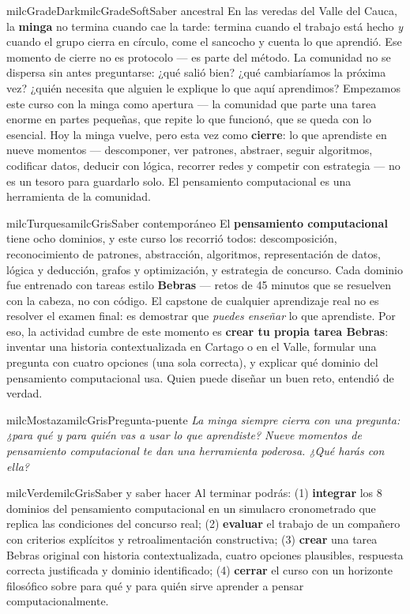 \documentclass[11pt,letterpaper]{article}
\begin{document}
\begin{softbox}{milcGradeDark}{milcGradeSoft}{Saber ancestral}
En las veredas del Valle del Cauca, la \textbf{minga} no termina cuando cae la tarde: termina cuando el trabajo está hecho \emph{y} cuando el grupo cierra en círculo, come el sancocho y cuenta lo que aprendió. Ese momento de cierre no es protocolo --- es parte del método. La comunidad no se dispersa sin antes preguntarse: ¿qué salió bien? ¿qué cambiaríamos la próxima vez? ¿quién necesita que alguien le explique lo que aquí aprendimos? Empezamos este curso con la minga como apertura --- la comunidad que parte una tarea enorme en partes pequeñas, que repite lo que funcionó, que se queda con lo esencial. Hoy la minga vuelve, pero esta vez como \textbf{cierre}: lo que aprendiste en nueve momentos --- descomponer, ver patrones, abstraer, seguir algoritmos, codificar datos, deducir con lógica, recorrer redes y competir con estrategia --- no es un tesoro para guardarlo solo. El pensamiento computacional es una herramienta de la comunidad.
\end{softbox}

\begin{softbox}{milcTurquesa}{milcGris}{Saber contemporáneo}
El \textbf{pensamiento computacional} tiene ocho dominios, y este curso los recorrió todos: descomposición, reconocimiento de patrones, abstracción, algoritmos, representación de datos, lógica y deducción, grafos y optimización, y estrategia de concurso. Cada dominio fue entrenado con tareas estilo \textbf{Bebras} --- retos de 45 minutos que se resuelven con la cabeza, no con código. El capstone de cualquier aprendizaje real no es resolver el examen final: es demostrar que \emph{puedes enseñar} lo que aprendiste. Por eso, la actividad cumbre de este momento es \textbf{crear tu propia tarea Bebras}: inventar una historia contextualizada en Cartago o en el Valle, formular una pregunta con cuatro opciones (una sola correcta), y explicar qué dominio del pensamiento computacional usa. Quien puede diseñar un buen reto, entendió de verdad.
\end{softbox}

\begin{softbox}{milcMostaza}{milcGris}{Pregunta-puente}
\textit{La minga siempre cierra con una pregunta: ¿para qué y para quién vas a usar lo que aprendiste? Nueve momentos de pensamiento computacional te dan una herramienta poderosa. ¿Qué harás con ella?}
\end{softbox}

\begin{softbox}{milcVerde}{milcGris}{Saber y saber hacer}
Al terminar podrás: (1) \textbf{integrar} los 8 dominios del pensamiento computacional en un simulacro cronometrado que replica las condiciones del concurso real; (2) \textbf{evaluar} el trabajo de un compañero con criterios explícitos y retroalimentación constructiva; (3) \textbf{crear} una tarea Bebras original con historia contextualizada, cuatro opciones plausibles, respuesta correcta justificada y dominio identificado; (4) \textbf{cerrar} el curso con un horizonte filosófico sobre para qué y para quién sirve aprender a pensar computacionalmente.
\end{softbox}
\end{document}
